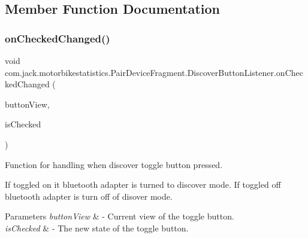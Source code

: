 \subsection{Member Function Documentation}
\mbox{\label{classcom_1_1jack_1_1motorbikestatistics_1_1_pair_device_fragment_1_1_discover_button_listener_a2bfd9ec10403a45d4d13fb2e035f0cad}} 
\subsubsection{\texorpdfstring{on\+Checked\+Changed()}{onCheckedChanged()}}
{\footnotesize\ttfamily void com.\+jack.\+motorbikestatistics.\+Pair\+Device\+Fragment.\+Discover\+Button\+Listener.\+on\+Checked\+Changed (\begin{DoxyParamCaption}\item[{Compound\+Button}]{button\+View,  }\item[{boolean}]{is\+Checked }\end{DoxyParamCaption})\hspace{0.3cm}{\ttfamily [inline]}}



Function for handling when discover toggle button pressed. 

If toggled on it bluetooth adapter is turned to discover mode. If toggled off bluetooth adapter is turn off of disover mode.


\begin{DoxyParams}{Parameters}
{\em button\+View} & -\/ Current view of the toggle button. \\
\hline
{\em is\+Checked} & -\/ The new state of the toggle button. \\
\hline
\end{DoxyParams}

